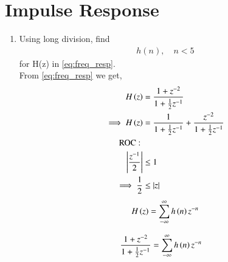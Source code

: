 \documentclass[journal,12pt,twocolumn]{IEEEtran}
\renewcommand\thesection{\arabic{section}}
\begin{document}
\section{Impulse Response}
\begin{enumerate}[label=\thesection.\arabic*]
\item Using long division, 
find
\begin{align}
	h(n), \quad n < 5
\end{align}
for H(z) in 
\eqref{eq:freq_resp}.\\
\solution
From \eqref{eq:freq_resp} we get,
\begin{align}
	H\left(z\right) &= \frac{1 + z^{-2}}{1 + \frac{1}{2}z^{-1}}\\
	\implies H\left(z\right) &= \frac{1}{1 + \frac{1}{2}z^{-1}} + \frac{z^{-2}}{1 + \frac{1}{2}z^{-1}}\\
	\text{ROC : } \\
	\left\vert\frac{z^{-1}}{2}\right\vert &\leq 1\\
	\implies \frac{1}{2} &\leq \left\vert z\right\vert
\end{align}
\begin{align}
	H\left(z\right) = \sum_{-\infty}^{\infty} h\left(n\right)z^{-n}
\end{align}

\begin{align}
	\frac{1 + z^{-2}}{1 + \frac{1}{2}z^{-1}} &= \sum_{-\infty}^{\infty} h\left(n\right)z^{-n}
\end{align}


\end{enumerate}
\end{document}
